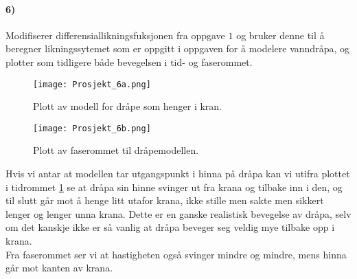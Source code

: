 \documentclass[11pt, A4paper,norsk]{article}
\begin{document}
		\paragraph{6)}
			\begin{flushleft}
Modifiserer differensiallikningsfuksjonen fra oppgave $1$ og bruker denne til å beregner likningssytemet som er oppgitt i oppgaven for å modelere vanndråpa, og plotter som tidligere både bevegelsen i tid- og faserommet.
			\end{flushleft}
			\begin{figure}[H]
\texttt{[image: Prosjekt\_6a.png]}
\caption{Plott av modell for dråpe som henger i kran.}
\label{6a}
			\end{figure}
			\begin{figure}[H]
\texttt{[image: Prosjekt\_6b.png]}
\caption{Plott av faserommet til dråpemodellen.}
\label{6b}
			\end{figure}
			\begin{flushleft}
Hvis vi antar at modellen tar utgangspunkt i hinna på dråpa kan vi utifra plottet i tidrommet \ref{6a} se at dråpa sin hinne svinger ut fra krana og tilbake inn i den, og til slutt går mot å henge litt utafor krana, ikke stille men sakte men sikkert lenger og lenger unna krana. Dette er en ganske realistisk bevegelse av dråpa, selv om det kanskje ikke er så vanlig at dråpa beveger seg veldig mye tilbake opp i krana. \\

Fra faserommet ser vi at hastigheten også svinger mindre og mindre, mens hinna går mot kanten av krana.
			\end{flushleft}
\end{document}

